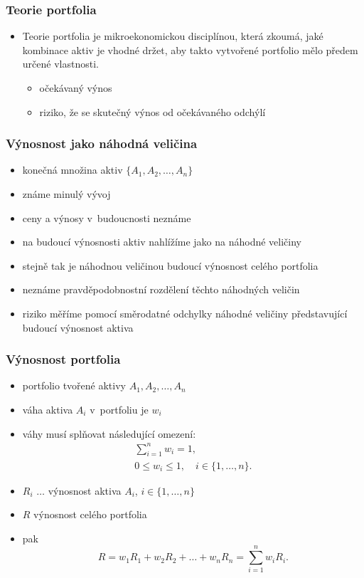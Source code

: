  \begin{frame}
    \frametitle{Teorie portfolia}
    \begin{itemize}
      \item Teorie portfolia je mikroekonomickou disciplínou, která zkoumá, jaké kombinace aktiv je vhodné držet, aby takto vytvořené portfolio mělo předem určené vlastnosti. \cite[str. 1]{camsky}
         \begin{itemize}
           \item očekávaný výnos
           \item riziko, že se skutečný výnos od očekávaného odchýlí
    \end{itemize}
    \end{itemize}
  \end{frame}
  \begin{frame}
    \frametitle{Výnosnost jako náhodná veličina}
    \begin{itemize}
      \item konečná množina aktiv $\{A_1,A_2,\dots,A_n\}$ 
      \item známe minulý vývoj
      \item ceny a výnosy v~budoucnosti neznáme
      \item na budoucí výnosnosti aktiv nahlížíme jako na náhodné veličiny
      \item stejně tak je náhodnou veličinou budoucí výnosnost celého portfolia
      \item neznáme pravděpodobnostní rozdělení těchto náhodných veličin
      \item riziko měříme pomocí směrodatné odchylky náhodné veličiny představující budoucí výnosnost aktiva
    \end{itemize}
  \end{frame}
  \begin{frame}
   \frametitle{Výnosnost portfolia}
      \begin{itemize}
        \item portfolio tvořené aktivy $A_1,A_2,\dots,A_n$
        \item váha aktiva $A_i$ v~portfoliu je $w_i$
        \item  váhy musí splňovat následující omezení:
			\begin{gather}
				\sum_{i=1}^n w_i = 1 \label{wr1}, \\
				0 \leq w_i \leq 1, \quad i\in\{1,\dots,n\}. \label{wr2}
			\end{gather}
        \item $R_i$ $\dots$ výnosnost aktiva $A_i$, $i \in \{1,\dots, n\}$
        \item $R$ výnosnost celého portfolia
        \item pak
          	\[
				R = w_1R_1+w_2R_2+\dots+w_nR_n = \sum_{i=1}^n w_iR_i.
			\]
      \end{itemize}
   \end{frame} 
   

